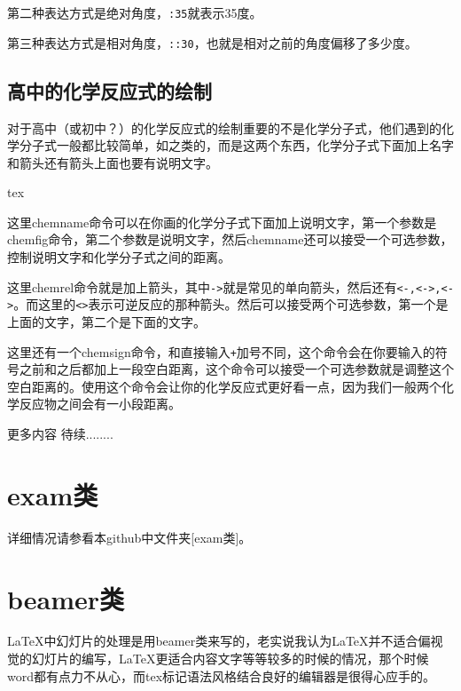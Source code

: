 \documentclass[11pt,oneside]{book}
\begin{document}
第二种表达方式是绝对角度，\verb+:35+就表示35度。

第三种表达方式是相对角度，\verb+::30+，也就是相对之前的角度偏移了多少度。

\section{高中的化学反应式的绘制}
对于高中（或初中？）的化学反应式的绘制重要的不是化学分子式，他们遇到的化学分子式一般都比较简单，如之类的，而是这两个东西，化学分子式下面加上名字和箭头还有箭头上面也要有说明文字。

\begin{tcbcode}{tex}
\chemrel[电解][点燃]{<>}
\chemsign{+}
\end{tcbcode}

\chemrel[电解][点燃]{<>}
\chemsign{+}

这里chemname命令可以在你画的化学分子式下面加上说明文字，第一个参数是chemfig命令，第二个参数是说明文字，然后chemname还可以接受一个可选参数，控制说明文字和化学分子式之间的距离。

这里chemrel命令就是加上箭头，其中\verb+->+就是常见的单向箭头，然后还有\verb+<-,<->,<->+。而这里的\verb+<>+表示可逆反应的那种箭头。然后可以接受两个可选参数，第一个是上面的文字，第二个是下面的文字。

这里还有一个chemsign命令，和直接输入\verb|+|加号不同，这个命令会在你要输入的符号之前和之后都加上一段空白距离，这个命令可以接受一个可选参数就是调整这个空白距离的。使用这个命令会让你的化学反应式更好看一点，因为我们一般两个化学反应物之间会有一小段距离。



更多内容 待续........

\chapter{exam类}
详细情况请参看本github中文件夹[exam类]。

\chapter{beamer类}
\LaTeX 中幻灯片的处理是用beamer类来写的，老实说我认为\LaTeX 并不适合偏视觉的幻灯片的编写，\LaTeX 更适合内容文字等等较多的时候的情况，那个时候 word都有点力不从心，而tex标记语法风格结合良好的编辑器是很得心应手的。
\end{document}
